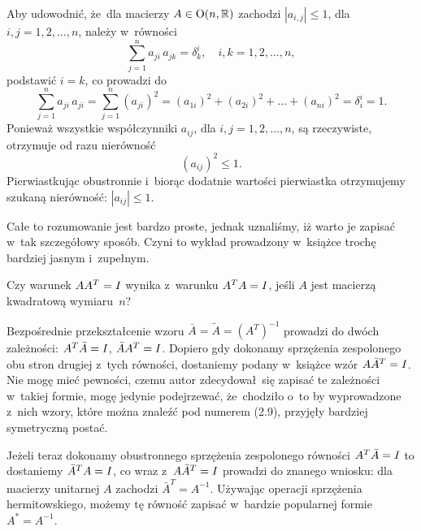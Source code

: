 \documentclass[a4paper,11pt]{article}
\numberwithin{equation}{section}
\begin{document}
\noindent
{} Aby udowodnić, że~dla macierzy $A \in \mathbf{\mathrm{O}}( n, \mathbb{R} )$
zachodzi $| a_{ i, j } | \leq 1$, dla $i, j = 1, 2, \ldots, n$, należy w~równości
\begin{equation}
  \label{eq:Wojtynski-04}
  \sum_{ j = 1 }^{ n } a_{ j i } \, a_{ j k } = \delta^{ i }_{ k }, \quad
  i, k = 1, 2, \ldots, n,
\end{equation}
podstawić $i = k$, co prowadzi do
\begin{equation}
  \label{eq:Wojtynski-05}
  \sum_{ j = 1 }^{ n } a_{ j i } \, a_{ j i } =
  \sum_{ j = 1 }^{ n } ( a_{ j i } )^{ 2 } =
  ( a_{ 1 i } )^{ 2 } + ( a_{ 2 i } )^{ 2 } + \ldots + ( a_{ n i } )^{ 2 } =
  \delta^{ i }_{ i } = 1.
\end{equation}
Ponieważ wszystkie współczynniki $a_{ i j }$, dla $i, j = 1, 2, \ldots, n$, są
rzeczywiste, otrzymuje od razu nierówność
\begin{equation}
  \label{eq:Wojtynski-06}
  ( a_{ i j } )^{ 2 } \leq 1.
\end{equation}
Pierwiastkując obustronnie i~biorąc dodatnie wartości pierwiastka
otrzymujemy szukaną nierówność: $| a_{ i j } | \leq 1$.

Całe to rozumowanie jest bardzo proste, jednak uznaliśmy, iż warto je
zapisać w~tak szczegółowy sposób. Czyni to wykład prowadzony w~książce
trochę bardziej jasnym i~zupełnym.

\VerSpaceFour





\noindent
{} Czy warunek $A A^{ T } = I$ wynika z~warunku
$A^{ T } A = I$, jeśli $A$ jest macierzą kwadratową wymiaru~$n$?

\VerSpaceFour





\noindent
{} Bezpośrednie przekształcenie wzoru
$\bar{A} = \widetilde{A} = ( A^{ T } )^{ -1 }$ prowadzi do dwóch zależności:
$A^{ T } \bar{A} = I$, $\bar{A} A^{ T } = I$. Dopiero gdy
dokonamy sprzężenia zespolonego obu stron drugiej z~tych równości,
dostaniemy podany w~książce wzór $A \bar{A}^{ T } = I$. Nie mogę
mieć pewności, czemu autor zdecydował~się zapisać te zależności w~takiej
formie, mogę jedynie podejrzewać, że~chodziło o~to by wyprowadzone z~nich
wzory, które można znaleźć pod numerem (2.9), przyjęły bardziej symetryczną
postać.

Jeżeli teraz dokonamy obustronnego sprzężenia zespolonego równości
$A^{ T } \bar{A} = I$ to dostaniemy $\bar{A}^{ T } A = I$, co
wraz z~$A \bar{A}^{ T } = I$ prowadzi do znanego wniosku: dla
macierzy unitarnej $A$ zachodzi $\bar{A}^{ T } = A^{ -1 }$. Używając
operacji sprzężenia hermitowskiego, możemy tę równość zapisać w~bardzie
popularnej formie $A^{ * } = A^{ -1 }$.
\end{document}
